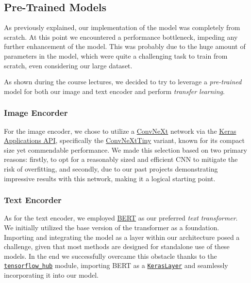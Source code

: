 \documentclass[12pt, a4paper]{article}
\begin{document}
\subsection{Pre-Trained Models}
As previously explained, our implementation of the model was completely from scratch. At this point we encountered a performance bottleneck, impeding any further enhancement of the model. This was probably due to the huge amount of parameters in the model, which were quite a challenging task to train from scratch, even considering our large dataset.

As shown during the course lectures, we decided to try to leverage a \textit{pre-trained} model for both our image and text encoder and perform \textit{transfer learning}.

\subsubsection{Image Encorder}
For the image encoder, we chose to utilize a \href{https://github.com/facebookresearch/ConvNeXt}{ConvNeXt} network via the \href{https://keras.io/api/applications/}{Keras Applications API}, specifically the \href{https://keras.io/api/applications/convnext/#convnexttiny-function}{ConvNeXtTiny} variant, known for its compact size yet commendable performance. We made this selection based on two primary reasons: firstly, to opt for a reasonably sized and efficient CNN to mitigate the risk of overfitting, and secondly, due to our past projects demonstrating impressive results with this network, making it a logical starting point.

\subsubsection{Text Encorder}
As for the text encoder, we employed \href{https://huggingface.co/docs/transformers/model_doc/bert}{BERT} as our preferred \textit{text transformer}. We initially utilized the base version of the transformer as a foundation. Importing and integrating the model as a layer within our architecture posed a challenge, given that most methods are designed for standalone use of these models. In the end we successfully overcame this obstacle thanks to the \href{https://www.tensorflow.org/hub}{\texttt{tensorflow\_hub}} module, importing BERT as a \href{https://www.tensorflow.org/hub/api_docs/python/hub/KerasLayer}{\texttt{KerasLayer}} and seamlessly incorporating it into our model.
\end{document}
